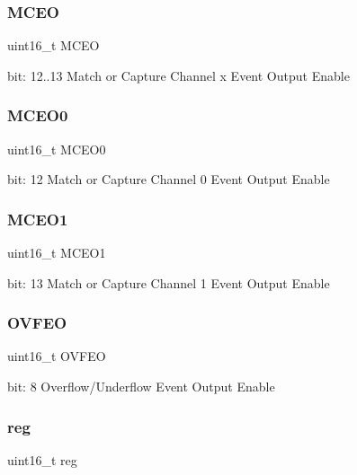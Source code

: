 \subsubsection{\texorpdfstring{MCEO}{MCEO}}
{\footnotesize\ttfamily uint16\+\_\+t M\+C\+EO}

bit\+: 12..13 Match or Capture Channel x Event Output Enable \mbox{\label{union_t_c___e_v_c_t_r_l___type_aba4082128d6a03384ecc38161fee7ea3}} 
\subsubsection{\texorpdfstring{MCEO0}{MCEO0}}
{\footnotesize\ttfamily uint16\+\_\+t M\+C\+E\+O0}

bit\+: 12 Match or Capture Channel 0 Event Output Enable \mbox{\label{union_t_c___e_v_c_t_r_l___type_a1cdf241856b11b8edf3f264507b3384e}} 
\subsubsection{\texorpdfstring{MCEO1}{MCEO1}}
{\footnotesize\ttfamily uint16\+\_\+t M\+C\+E\+O1}

bit\+: 13 Match or Capture Channel 1 Event Output Enable \mbox{\label{union_t_c___e_v_c_t_r_l___type_ad5675910f0a67704471b8e7f6ea2014e}} 
\subsubsection{\texorpdfstring{OVFEO}{OVFEO}}
{\footnotesize\ttfamily uint16\+\_\+t O\+V\+F\+EO}

bit\+: 8 Overflow/\+Underflow Event Output Enable \mbox{\label{union_t_c___e_v_c_t_r_l___type_a11760f5020019f4aa8cb02e694f7cc44}} 
\subsubsection{\texorpdfstring{reg}{reg}}
{\footnotesize\ttfamily uint16\+\_\+t reg}

